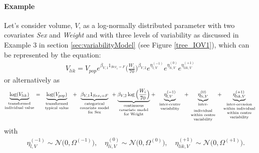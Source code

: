\paragraph{Example}
Let's consider volume, $V$, as a log-normally distributed parameter with two covariates \textit{Sex} and \textit{Weight} and with three levels of variability as discussed in Example 3 in section \ref{sec:variabilityModel} (see Figure \ref{tree_IOV1}), which can be represented by the equation:
\begin{align*}
V_{lik} = V_{pop} e^{\beta_{V,1} 1_{Sex_i=F}} \Big(\frac{W_i}{70}\Big)^{\beta_{V,2}} e^{\eta_{l,V}^{(-1)}}  e^{\eta_{li,V}^{(0)}} e^{\eta_{lik,V}^{(+1)}}
\end{align*}
or alternatively as
\begin{align*}
\underbrace{\log(V_{lik})}_{\text{\parbox{2cm}{\centering transformed\\[-4pt] individual value}}} =
\underbrace{\log(V_{pop})}_{\text{\parbox{2cm}{\centering transformed\\[-4pt] typical value}}} +
\underbrace{\beta_{V,1} 1_{Sex_i=F}}_{\text{\parbox{2.2cm}{\centering categorical\\[-4pt] covariate model\\[-4pt] for Sex}}}
+ \underbrace{\beta_{V,2} \log\Big(\frac{W_i}{70}\Big)}_{\text{\parbox{2.2cm}{\centering continuous\\[-4pt] covariate model\\[-4pt] for Weight}}}
+ \underbrace{\eta_{l,V}^{(-1)}}_{\text{\parbox{1.8cm}{\centering inter-centre\\[-4pt]  variability}}}
+ \underbrace{\eta_{li,V}^{(0)}}_{\text{\parbox{1.8cm}{\centering inter-individual\\[-4pt] within centre \\[-4pt]  variability}}}
+ \underbrace{\eta_{lik,V}^{(+1)}}_{\text{\parbox{2.2cm}{\centering inter-occasion\\[-4pt] within individual \\[-4pt] within centre \\[-4pt] variability}}}
\end{align*}
with
\begin{align*}
 && \eta_{l,V}^{(-1)} \sim \mathcal{N}\big(0,\Omega^{(-1)}\big), \quad \eta_{li,V}^{(0)} \sim \mathcal{N}\big(0,\Omega^{(0)}\big),
\quad \eta_{lik,V}^{(+1)} \sim \mathcal{N}\big(0,\Omega^{(+1)}\big).
\end{align*}
